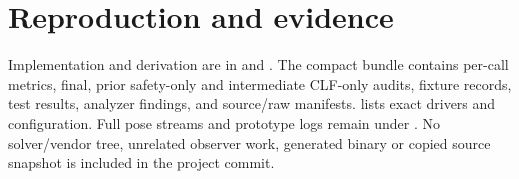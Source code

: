 \documentclass[11pt]{article}
\begin{document}
\section{Reproduction and evidence}
Implementation and derivation are in
 and
. The compact bundle
 contains per-call metrics, final, prior safety-only and intermediate CLF-only audits,
fixture records, test results, analyzer findings, and source/raw manifests.
 lists exact drivers and configuration.
Full pose streams and prototype logs remain under
.
No solver/vendor tree, unrelated observer work, generated binary or copied
source snapshot is included in the project commit.
\end{document}
